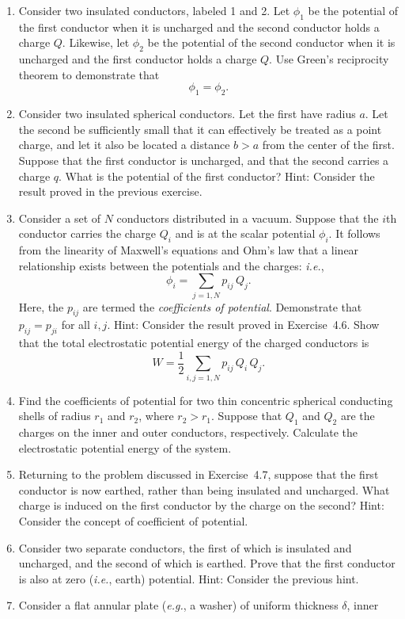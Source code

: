 {\begin{enumerate}
\item Consider two insulated conductors, labeled 1 and 2. Let $\phi_1$ be the
potential of the first conductor when it is uncharged and the second conductor holds a
charge $Q$. Likewise, let $\phi_2$ be the potential of the second conductor
when it is uncharged and the first conductor holds a charge $Q$. Use Green's
reciprocity theorem to demonstrate that
$$
\phi_1 = \phi_2.
$$
\item Consider two  insulated spherical conductors. Let the
first have radius $a$. Let the second be sufficiently small that it
can effectively be treated as a point charge, and let it also be located a distance $b>a$ from
the center of the first. Suppose that the first conductor is uncharged, and that the second carries a charge $q$. What is the potential of the first conductor?
Hint: Consider the result proved in the previous exercise.
\item Consider a set of $N$ conductors distributed in a vacuum. Suppose that
the $i$th conductor carries the charge $Q_i$ and is at the scalar potential
$\phi_i$. It follows from the linearity of Maxwell's equations and Ohm's law
that a linear relationship exists between the potentials and the charges:
{\em i.e.},
$$
\phi_i = \sum_{j=1,N} p_{ij}\,Q_j.
$$
Here, the $p_{ij}$ are termed the {\em coefficients of potential}. Demonstrate that $p_{ij} = p_{ji}$ for all $i,j$. Hint: Consider the result
proved in Exercise~4.6. Show that the total electrostatic potential energy of
the charged conductors is
$$
W = \frac{1}{2}\sum_{i,j=1,N}p_{ij}\,Q_i\,Q_j.
$$
\item Find the coefficients of potential for two thin concentric spherical conducting shells of radius $r_1$ and $r_2$, where $r_2> r_1$. Suppose that $Q_1$ and
$Q_2$ are the charges on the inner and outer conductors, respectively.
Calculate the electrostatic potential energy of the system.
\item Returning to the problem discussed in Exercise~4.7, suppose that the
first conductor is now earthed, rather than being insulated and uncharged. What
charge is induced on the first conductor by the charge on the second? Hint:
Consider the concept of coefficient of potential. 
\item Consider two separate conductors, the first of which is
insulated and uncharged, and the second of which is earthed. Prove that the
first conductor is also at zero ({\em i.e.}, earth) potential. Hint: Consider the
previous hint.
\item Consider a flat annular plate ({\em e.g.}, a washer) of uniform thickness $\delta$, inner

\end{enumerate}}
